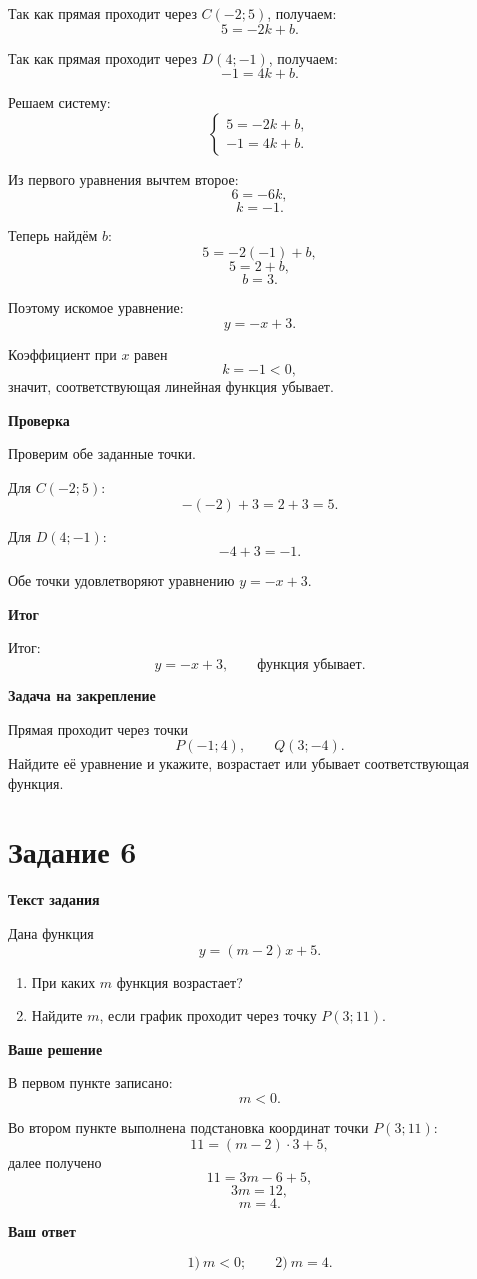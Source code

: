 \documentclass[12pt,a4paper]{article}
\newcommand{\reviewhead}[1]{%
  \par\medskip
  \noindent\textbf{#1}\par\smallskip
}
\begin{document}
Так как прямая проходит через \(C(-2;5)\), получаем:
\[
5=-2k+b.
\]

Так как прямая проходит через \(D(4;-1)\), получаем:
\[
-1=4k+b.
\]

Решаем систему:
\[
\begin{cases}
5=-2k+b,\\
-1=4k+b.
\end{cases}
\]

Из первого уравнения вычтем второе:
\[
6=-6k,
\]
\[
k=-1.
\]

Теперь найдём \(b\):
\[
5=-2(-1)+b,
\]
\[
5=2+b,
\]
\[
b=3.
\]

Поэтому искомое уравнение:
\[
\boxed{y=-x+3}.
\]

Коэффициент при \(x\) равен
\[
k=-1<0,
\]
значит, соответствующая линейная функция убывает.

\reviewhead{Проверка}
Проверим обе заданные точки.

Для \(C(-2;5)\):
\[
-(-2)+3=2+3=5.
\]

Для \(D(4;-1)\):
\[
-4+3=-1.
\]

Обе точки удовлетворяют уравнению \(y=-x+3\).

\reviewhead{Итог}
\textcolor{teal!60!black}{Итог:}
\[
y=-x+3,\qquad \text{функция убывает}.
\]

\reviewhead{Задача на закрепление}
Прямая проходит через точки
\[
P(-1;4),\qquad Q(3;-4).
\]
Найдите её уравнение и укажите, возрастает или убывает соответствующая функция.

\newpage
{}\label{task:6}
\section*{Задание 6}

\reviewhead{Текст задания}
Дана функция
\[
y=(m-2)x+5.
\]
\begin{enumerate}
\item При каких \(m\) функция возрастает?
\item Найдите \(m\), если график проходит через точку \(P(3;11)\).
\end{enumerate}

\reviewhead{Ваше решение}
В первом пункте записано:
\[
m<0.
\]

Во втором пункте выполнена подстановка координат точки \(P(3;11)\):
\[
11=(m-2)\cdot 3+5,
\]
далее получено
\[
11=3m-6+5,
\]
\[
3m=12,
\]
\[
m=4.
\]

\reviewhead{Ваш ответ}
\[
1)\ m<0;\qquad 2)\ m=4.
\]
\end{document}
